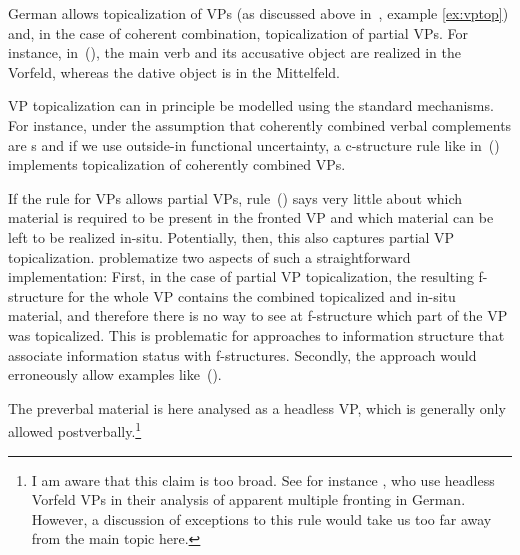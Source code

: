 \documentclass[output=paper,hidelinks]{langscibook}
\begin{document}
German allows topicalization of VPs (as discussed above
in~, example \ref{ex:vptop}) and, in the case
of coherent combination, topicalization of partial VPs. For instance,
in~(), the main verb and its accusative object are realized in
the Vorfeld, whereas the dative object is in the Mittelfeld.
%
\begin{exe} 
\end{exe}
%
VP topicalization can in principle be modelled using the
standard mechanisms. For instance, under the assumption that
coherently combined verbal complements are \XCOMP{}s and if we use
outside-in functional uncertainty, a c-structure rule like
in~() implements topicalization of coherently combined VPs. 
%
\begin{exe}
  \ex {}
\end{exe}
%
If the rule for VPs allows partial VPs, rule~() says very
little about which material is required to be present in the fronted
VP and which material can be left to be realized in-situ. Potentially,
then, this also captures partial VP
topicalization. \citet{ZaenenKaplan2002:Subsumption} problematize two
aspects of such a straightforward implementation: First, in the case
of partial VP topicalization, the resulting f-structure for the whole
VP contains the combined topicalized and in-situ material, and
therefore there is no way to see at f-structure which part of the VP
was topicalized. This is problematic for approaches to information
structure that associate information status with
f-structures. Secondly, the approach would erroneously allow examples
like~().
%
\begin{exe}
  \ex[*]{%
    \gll $[$Ihr ein Märchen$]$ wird er erzählen.\\
         \phantom{$[$}her.\DAT{} a {fairy tale} will he tell.\INF{}\\
    \glt `He will tell her a fairy tale.'
         }
\end{exe}
%
The preverbal material is here analysed as a headless VP, which is
generally only allowed postverbally.\footnote{I am aware that this
claim is too broad. See for instance \citet{muller-etal:2012}, who use
headless Vorfeld VPs in their analysis of apparent multiple fronting
in German. However, a discussion of exceptions to this rule would take
us too far away from the main topic here.}
\end{document}
